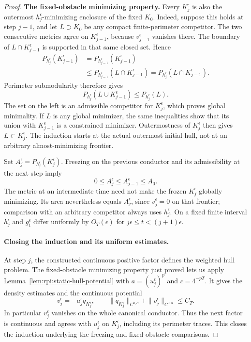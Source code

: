 \begin{proof}
\textbf{The fixed-obstacle minimizing property.}\quad
Every $K_j^\epsilon$ is also the outermost
$h_j^\epsilon$-minimizing enclosure of the fixed $K_0$.
Indeed, suppose this holds at step $j-1$, and let $L\supset K_0$
be any compact finite-perimeter competitor. The two consecutive metrics agree on
$K_{j-1}^\epsilon$, because $v_{j-1}^\epsilon$ vanishes there.
The boundary of $L\cap K_{j-1}^\epsilon$ is supported in that same
closed set. Hence
\[
 \begin{aligned}
 P_{h_j^\epsilon}(K_{j-1}^\epsilon)
 &=P_{h_{j-1}^\epsilon}(K_{j-1}^\epsilon)\\
 &\le P_{h_{j-1}^\epsilon}(L\cap K_{j-1}^\epsilon)
 =P_{h_j^\epsilon}(L\cap K_{j-1}^\epsilon).
 \end{aligned}
\]
Perimeter submodularity therefore gives
\[
 P_{h_j^\epsilon}(L\cup K_{j-1}^\epsilon)
 \le P_{h_j^\epsilon}(L).
\]
The set on the left is an admissible competitor for $K_j^\epsilon$,
which proves global minimality. If $L$ is any global minimizer,
the same inequalities show that its union with $K_{j-1}^\epsilon$
is a constrained minimizer. Outermostness of $K_j^\epsilon$ then
gives $L\subset K_j^\epsilon$. The induction starts at the actual
outermost initial hull, not at an arbitrary almost-minimizing
frontier.

Set $A_j^\epsilon=P_{h_j^\epsilon}(K_j^\epsilon)$. Freezing on the
previous conductor and its admissibility at the next step imply
\[
 0\le A_j^\epsilon\le A_{j-1}^\epsilon\le A_0.
\]
The metric at an intermediate time need not make the frozen
$K_j^\epsilon$ globally minimizing. Its area nevertheless equals
$A_j^\epsilon$, since $v_j^\epsilon=0$ on that frontier; comparison
with an arbitrary competitor always uses $h_j^\epsilon$.
On a fixed finite interval $h_j^\epsilon$ and $g_t^\epsilon$ differ
uniformly by $O_T(\epsilon)$ for
$j\epsilon\le t<(j+1)\epsilon$.


\paragraph{Closing the induction and its uniform estimates.}
At step $j$, the constructed continuous positive factor defines the
weighted hull problem. The fixed-obstacle minimizing property just
proved lets us apply Lemma~\ref{lem:rpi:static-hull-potential} with
$a=(u_j^\epsilon)^p$ and $c=4^{-pT}$. It gives the density estimates
and the continuous potential
\[
 v_j^\epsilon=-a_j^\epsilon q_{K_j^\epsilon},\qquad
 \|q_{K_j^\epsilon}\|_{C^{0,\alpha}}
       +\|v_j^\epsilon\|_{C^{0,\alpha}}\le C_T.
\]
In particular $v_j^\epsilon$ vanishes on the whole canonical conductor.
Thus the next factor is continuous and agrees with $u_j^\epsilon$
on $K_j^\epsilon$, including its perimeter traces. This closes the
induction underlying the freezing and fixed-obstacle comparisons.


\end{proof}
